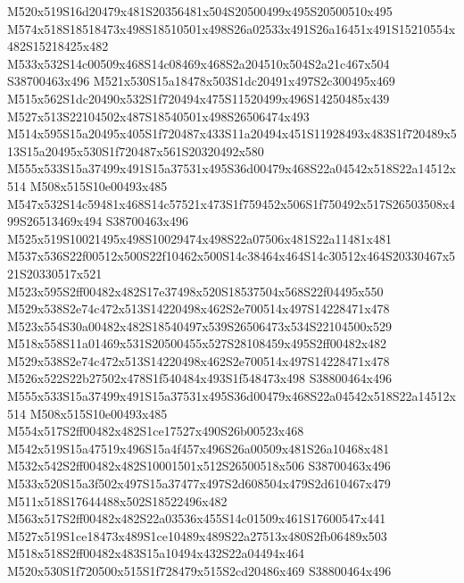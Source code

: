 \documentclass{article}
\begin{document}
\begin{multicols}{2}
M520x519S16d20479x481S20356481x504S20500499x495S20500510x495 M574x518S18518473x498S18510501x498S26a02533x491S26a16451x491S15210554x482S15218425x482 M533x532S14c00509x468S14c08469x468S2a204510x504S2a21c467x504 S38700463x496 M521x530S15a18478x503S1dc20491x497S2c300495x469 M515x562S1dc20490x532S1f720494x475S11520499x496S14250485x439 M527x513S22104502x487S18540501x498S26506474x493 M514x595S15a20495x405S1f720487x433S11a20494x451S11928493x483S1f720489x513S15a20495x530S1f720487x561S20320492x580 M555x533S15a37499x491S15a37531x495S36d00479x468S22a04542x518S22a14512x514 M508x515S10e00493x485 M547x532S14c59481x468S14c57521x473S1f759452x506S1f750492x517S26503508x499S26513469x494 S38700463x496 M525x519S10021495x498S10029474x498S22a07506x481S22a11481x481 M537x536S22f00512x500S22f10462x500S14c38464x464S14c30512x464S20330467x521S20330517x521 M523x595S2ff00482x482S17e37498x520S18537504x568S22f04495x550 M529x538S2e74c472x513S14220498x462S2e700514x497S14228471x478 M523x554S30a00482x482S18540497x539S26506473x534S22104500x529 M518x558S11a01469x531S20500455x527S28108459x495S2ff00482x482 M529x538S2e74c472x513S14220498x462S2e700514x497S14228471x478 M526x522S22b27502x478S1f540484x493S1f548473x498 S38800464x496 M555x533S15a37499x491S15a37531x495S36d00479x468S22a04542x518S22a14512x514 M508x515S10e00493x485 M554x517S2ff00482x482S1ce17527x490S26b00523x468 M542x519S15a47519x496S15a4f457x496S26a00509x481S26a10468x481 M532x542S2ff00482x482S10001501x512S26500518x506 S38700463x496 M533x520S15a3f502x497S15a37477x497S2d608504x479S2d610467x479 M511x518S17644488x502S18522496x482 M563x517S2ff00482x482S22a03536x455S14c01509x461S17600547x441 M527x519S1ce18473x489S1ce10489x489S22a27513x480S2fb06489x503 M518x518S2ff00482x483S15a10494x432S22a04494x464 M520x530S1f720500x515S1f728479x515S2cd20486x469 S38800464x496 





\end{multicols}
\end{document}
